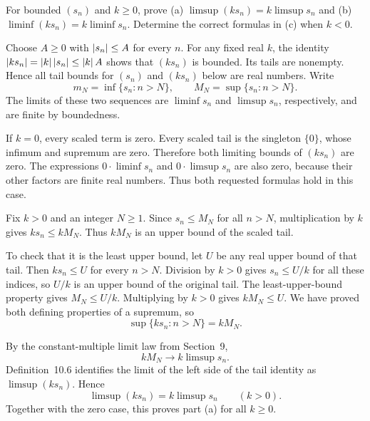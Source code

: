 

\goal For bounded $(s_n)$ and $k\ge0$, prove (a)
$\limsup(ks_n)=k\limsup s_n$ and (b)
$\liminf(ks_n)=k\liminf s_n$. Determine the correct formulas in
(c) when $k<0$.

Choose $A\ge0$ with $\left|s_n\right|\le A$ for every $n$.
For any fixed real $k$, the identity
$\left|ks_n\right|=\left|k\right|\left|s_n\right|\le\left|k\right|A$ shows that $(ks_n)$
is bounded. Its tails are nonempty. Hence all tail bounds for
$(s_n)$ and $(ks_n)$ below are real numbers.
Write
\[
 m_N=\inf\{s_n:n>N\},\qquad M_N=\sup\{s_n:n>N\}.
\]
The limits of these two sequences are $\liminf s_n$ and
$\limsup s_n$, respectively, and are finite by boundedness.

If $k=0$, every scaled term is zero. Every scaled tail is the
singleton $\{0\}$, whose infimum and supremum are zero.
Therefore both limiting bounds of $(ks_n)$ are zero. The expressions
$0\cdot\liminf s_n$ and $0\cdot\limsup s_n$ are also zero,
because their other factors are finite real numbers. Thus both
requested formulas hold in this case.

Fix $k>0$ and an integer $N\ge1$. Since $s_n\le M_N$ for all
$n>N$, multiplication by $k$ gives $ks_n\le kM_N$.
Thus $kM_N$ is an upper bound of the scaled tail.

To check that it is the least upper bound, let $U$ be any real upper
bound of that tail. Then $ks_n\le U$ for every $n>N$.
Division by $k>0$ gives $s_n\le U/k$ for all these indices, so
$U/k$ is an upper bound of the original tail. The least-upper-bound
property gives $M_N\le U/k$. Multiplying by $k>0$ gives
$kM_N\le U$. We have proved both defining properties of a
supremum, so
\[
 \sup\{ks_n:n>N\}=kM_N.
\]

By the constant-multiple limit law from Section~9,
\[
 kM_N\longrightarrow k\limsup s_n.
\]
Definition~10.6 identifies the limit of the left side of the tail
identity as $\limsup(ks_n)$. Hence
\[
 \boxed{\limsup(ks_n)=k\limsup s_n}\qquad(k>0).
\]
Together with the zero case, this proves part (a) for all $k\ge0$.


